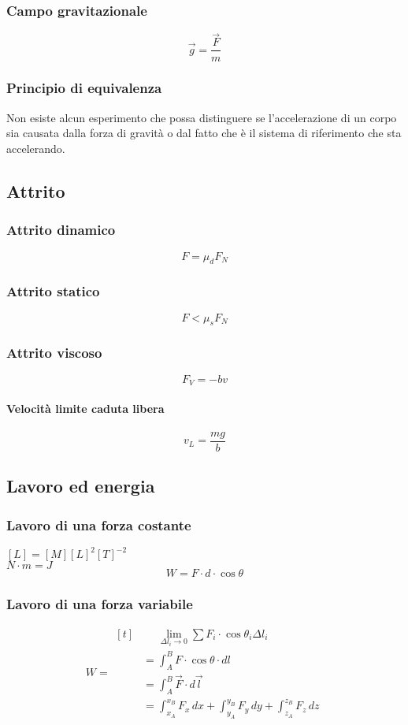 \documentclass[a4paper,12pt]{article}
\theoremstyle{mystyle}
\begin{document}
\subsubsection{Campo gravitazionale}
\[\vec g = \frac{\vec F}{m}\]
\subsubsection{Principio di equivalenza}
\parbox{0.8\textwidth}{
Non esiste alcun esperimento che possa distinguere se l'accelerazione di un corpo sia causata dalla forza di gravità o dal fatto che è il sistema di riferimento che sta accelerando.
}

\newpage

\subsection{Attrito}
\subsubsection{Attrito dinamico}
\[F= \mu _d F_N\]
\subsubsection{Attrito statico}
\[F < \mu _s F_N\]
\subsubsection{Attrito viscoso}
\[F_V =-bv\]
\paragraph{Velocità limite caduta libera}
\[v_L = \frac{mg}{b}\]

\newpage



\subsection{Lavoro ed energia}
\subsubsection{Lavoro di una forza costante}
\([L]=[M][L]^2[T]^{-2}\)\\
\(N \cdot m = J\)\\
\[W = F \cdot d \cdot \cos \theta\]

\subsubsection{Lavoro di una forza variabile}
\[
W = \begin{aligned}[t]
    &\phantom{=} \lim_{\Delta l_i \rightarrow 0} \sum F_i \cdot \cos \theta_i \Delta l_i \\
    &= \int_A^B F \cdot \cos \theta \cdot dl \\
    &= \int_A^B \vec{F} \cdot d\vec{l} \\
    &= \int_{x_A}^{x_B} F_x \, dx + \int_{y_A}^{y_B} F_y \, dy + \int_{z_A}^{z_B} F_z \, dz
\end{aligned}
\]
\end{document}
